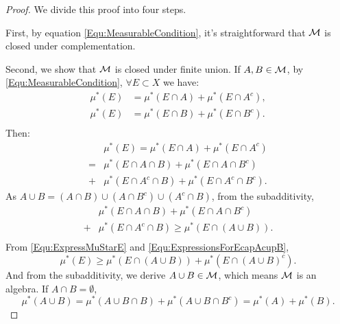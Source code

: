 \begin{proof}
    We divide this proof into four steps.
    
    First, by equation \eqref{Equ:MeasurableCondition}, it's straightforward 
    that $\mathcal{M}$ is closed under complementation. 

    Second, we show that $\mathcal{M}$ is closed under finite union. 
    If $A,B\in\mathcal{M}$, by \eqref{Equ:MeasurableCondition}, 
    $\forall E\subset X$ we have:
    \begin{equation*}
        \label{Equ:ABMeasurable}
        \begin{array}{rl}
            \mu^{*}(E)&=\mu^{*}(E\cap A)+\mu^{*}(E\cap A^c),\\
            \mu^{*}(E)&=\mu^{*}(E\cap B)+\mu^{*}(E\cap B^c).\\
        \end{array}
    \end{equation*}
    Then:
    \begin{equation}
        \label{Equ:ExpressMuStarE}
        \begin{array}{rl}
        &\mu^{*}(E)=\mu^{*}(E\cap A)+\mu^{*}(E\cap A^c)\\
        =&\mu^{*}(E\cap A\cap B)+\mu^{*}(E\cap A\cap B^c)\\
        +&\mu^{*}(E\cap A^c\cap B)+\mu^{*}(E\cap A^c\cap B^c).
        \end{array}
    \end{equation}
    As $A\cup B=(A\cap B)\cup(A\cap B^c)\cup(A^c\cap B)$, 
    from the subadditivity, 
    \begin{equation}
        \label{Equ:ExpressionsForEcapAcupB}
        \begin{array}{rl}
        &\mu^{*}(E\cap A\cap B)+\mu^{*}(E\cap A\cap B^c)\\
        +&\mu^{*}(E\cap A^c\cap B)\ge\mu^{*}(E\cap(A\cup B)).\\
        \end{array}
    \end{equation}
    From \eqref{Equ:ExpressMuStarE} and 
    \eqref{Equ:ExpressionsForEcapAcupB}, 
    \begin{displaymath}
        \mu^{*}(E)\ge\mu^{*}(E\cap (A\cup B))+\mu^{*}(E\cap (A\cup B)^c).
    \end{displaymath}
    And from the subadditivity, we derive $A\cup B\in\mathcal{M}$, 
    which means $\mathcal{M}$ is an algebra. If $A\cap B=\emptyset$, 
    \begin{displaymath}
        \mu^{*}(A\cup B)=\mu^{*}(A\cup B\cap B)+
        \mu^{*}(A\cup B\cap B^c)=\mu^{*}(A)+\mu^{*}(B).
    \end{displaymath}


\end{proof}

